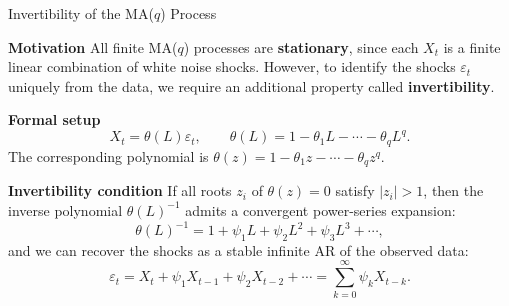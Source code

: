\documentclass{beamer}
\begin{document}
\begin{frame}{Invertibility of the MA($q$) Process}
\small

\textbf{Motivation}  
All finite MA($q$) processes are \textbf{stationary}, since each $X_t$ is a finite
linear combination of white noise shocks.  
However, to identify the shocks $\varepsilon_t$ uniquely from the data,
we require an additional property called \textbf{invertibility}.

\bigskip
\textbf{Formal setup}
\[
X_t = \theta(L)\varepsilon_t, 
\qquad \theta(L) = 1 - \theta_1 L - \cdots - \theta_q L^q.
\]
The corresponding polynomial is $\theta(z)=1-\theta_1 z-\cdots-\theta_q z^q$.

\pause
\textbf{Invertibility condition}  
If all roots $z_i$ of $\theta(z)=0$ satisfy $|z_i|>1$,
then the inverse polynomial $\theta(L)^{-1}$ admits a
convergent power-series expansion:
\[
\theta(L)^{-1}=1+\psi_1 L+\psi_2 L^2+\psi_3 L^3+\cdots ,
\]
and we can recover the shocks as a stable infinite AR of the observed data:
\[
\varepsilon_t = X_t + \psi_1 X_{t-1} + \psi_2 X_{t-2} + \cdots 
               = \sum_{k=0}^{\infty} \psi_k X_{t-k}.
\]
\end{frame}
\end{document}
